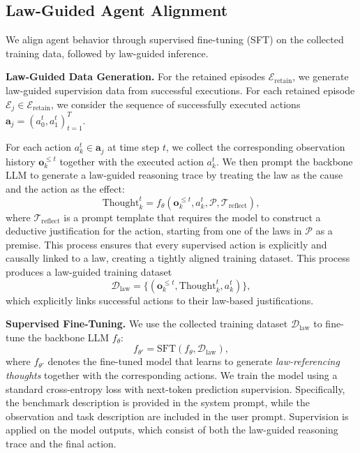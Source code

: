 \documentclass{article}
\theoremstyle{plain}
\theoremstyle{definition}
\theoremstyle{remark}
\newcommand{\AC}[1]{\textcolor{red}{~AC: {#1}}}
\begin{document}
\subsection{Law-Guided Agent Alignment}

We align agent behavior through supervised fine-tuning (SFT) on the collected training data, followed by law-guided inference.

\textbf{Law-Guided Data Generation.} 
For the retained episodes $\mathcal{E}_{\text{retain}}$, we generate law-guided supervision data from successful executions. For each retained episode $\mathcal{E}_j \in \mathcal{E}_{\text{retain}}$, we consider the sequence of successfully executed actions $\mathbf{a}_j = (a_0^t, a_1^t)_{t=1}^{T}$. %

For each action $a_k^t \in \mathbf{a}_j$ at time step $t$, we collect the corresponding observation history $\mathbf{o}_k^{\leq t}$ together with the executed action $a_k^t$. We then prompt the backbone LLM to generate a law-guided reasoning trace by treating the law as the cause and the action as the effect:
\begin{equation}
\text{Thought}_k^t = f_\theta(\mathbf{o}_k^{\leq t}, a_k^t, \mathcal{P}, \mathcal{T}_{\text{reflect}}),
\end{equation}
where $\mathcal{T}_{\text{reflect}}$ is a prompt template that requires the model to construct a deductive justification for the action, starting from one of the laws in $\mathcal{P}$ as a premise. This process ensures that every supervised action is explicitly and causally linked to a law, creating a tightly aligned training dataset. This process produces a law-guided training dataset
\begin{equation}
\mathcal{D}_{\text{law}} = \{(\mathbf{o}_k^{\leq t}, \text{Thought}_k^t, a_k^t)\},
\end{equation}
which explicitly links successful actions to their law-based justifications.

\textbf{Supervised Fine-Tuning.} We use the collected training dataset $\mathcal{D}_{\text{law}}$ to fine-tune the backbone LLM $f_\theta$:
\begin{equation}
f_{\theta'} = \text{SFT}(f_\theta, \mathcal{D}_{\text{law}}),
\end{equation}
where $f_{\theta'}$ denotes the fine-tuned model that learns to generate \emph{law-referencing thoughts} together with the corresponding actions. We train the model using a standard cross-entropy loss with next-token prediction supervision. Specifically, the benchmark description is provided in the system prompt, while the observation and task description are included in the user prompt. Supervision is applied on the model outputs, which consist of both the law-guided reasoning trace and the final action.
\end{document}
